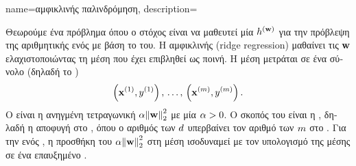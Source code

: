 {name={\foreignlanguage{greek}{αμφικλινής παλινδρόμηση}}, 
	description={\foreignlanguage{greek}{Θεωρούμε ένα πρόβλημα}  \foreignlanguage{greek}{όπου 
		ο στόχος είναι να μαθευτεί μία}  $h^{({\bf w})}$ 
		\foreignlanguage{greek}{για την πρόβλεψη της αριθμητικής}  \foreignlanguage{greek}{ενός} 
		 \foreignlanguage{greek}{με βάση το}  \foreignlanguage{greek}{του}. 
	  	\foreignlanguage{greek}{Η αμφικλινής}  
		(ridge regression) \foreignlanguage{greek}{μαθαίνει τις}  ${\bf w}$ \foreignlanguage{greek}{ελαχιστοποιώντας 
		τη μέση}  \foreignlanguage{greek}{που έχει επιβληθεί ως ποινή. Η μέση}  
		\foreignlanguage{greek}{μετράται σε ένα σύνολο}  \foreignlanguage{greek}{(δηλαδή το} 
		) $$\left( {\bf x}^{(1)},y^{(1)} \right), \,\ldots, \,\left( {\bf x}^{(m)},y^{(m)} \right).$$ 
		\foreignlanguage{greek}{Ο}  \foreignlanguage{greek}{είναι η ανηγμένη τετραγωνική}  
		$\regparam \normgeneric{\weights}{2}^{2}$ \foreignlanguage{greek}{με μία}   
		$\alpha > 0$. \foreignlanguage{greek}{Ο σκοπός του}  \foreignlanguage{greek}{είναι η} 
		, \foreignlanguage{greek}{δηλαδή η αποφυγή}  \foreignlanguage{greek}{στο} 
		, \foreignlanguage{greek}{όπου ο αριθμός των}  $d$ 
		\foreignlanguage{greek}{υπερβαίνει τον αριθμό των}  $m$ \foreignlanguage{greek}{στο} 
		. \foreignlanguage{greek}{Για την}  \foreignlanguage{greek}{ενός} , 
		\foreignlanguage{greek}{η προσθήκη του $\regparam \normgeneric{\weights}{2}^{2}$ στη μέση}  
		\foreignlanguage{greek}{ισοδυναμεί με τον υπολογισμό της μέσης}  \foreignlanguage{greek}{σε ένα 
		επαυξημένο} . 
		\begin{figure}[H]
			\begin{center} 
				\begin{tikzpicture}[scale = 1]

\end{tikzpicture}
\end{center}
\end{figure}}}

